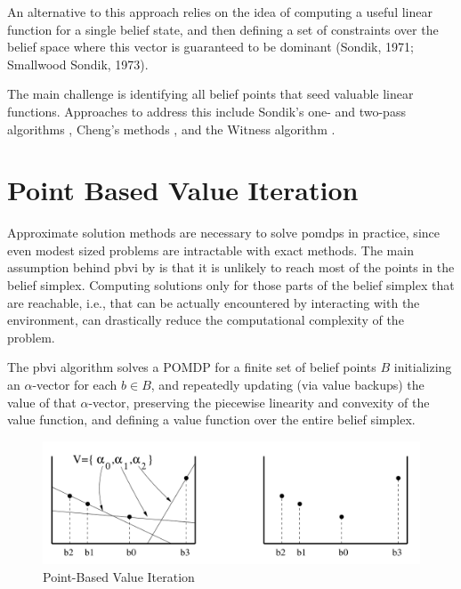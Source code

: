 An alternative to this approach relies on the idea of computing a useful linear function for a
single belief state, and then defining a set of constraints over the belief space where this vector 
is guaranteed to be dominant (Sondik, 1971; Smallwood  Sondik, 1973).

The main challenge is identifying all belief points that seed valuable linear functions. 
Approaches to address this include Sondik's one- and two-pass algorithms \cite{c6635fb4-4e99-3bcb-ba95-fb8ac7476062}, 
Cheng's methods \cite{Cheng_1988}, and the Witness algorithm 
\cite{10.5555/864404,10.5555/2891730.2891888}.

\section{Point Based Value Iteration}
Approximate solution methods are necessary to solve \glspl{pomdp} in practice, since even modest 
sized problems are intractable with exact methods.
The main assumption behind \gls{pbvi} by \cite{10.5555/1630659.1630806} is that
it is unlikely to reach most of the points in the belief simplex.
Computing solutions only for those parts of the belief simplex that are reachable, i.e.,
that can be actually encountered by interacting with the environment, can drastically reduce 
the computational complexity of the problem.

The \gls{pbvi} algorithm solves a POMDP for a finite set of belief points $B$
initializing an $\alpha$-vector for each $b \in B$, and repeatedly updating 
(via value backups) the value of that $\alpha$-vector, preserving the piecewise linearity 
and convexity of the value function, and defining a value
function over the entire belief simplex.
\begin{figure}[H]
    \centering
    \includegraphics[scale=.35]{images/pbvi.png}
    \caption{Point-Based Value Iteration}
    \label{fig:pbvi}
\end{figure}



